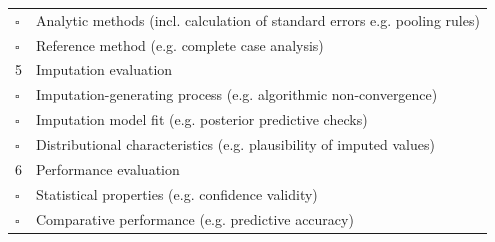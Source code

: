 \documentclass[bimj,fleqn]{w-art}
\begin{document}
\begin{table}[ht]
\begin{tabular}{ll}
$\square$  & Analytic methods (incl. calculation of standard errors e.g. pooling   rules)       \\
$\square$  & Reference method (e.g. complete case analysis)                                    \\ \hline 
5 & Imputation evaluation                                                              \\ \cline{2-2}
$\square$  & Imputation-generating process (e.g. algorithmic non-convergence)                   \\
$\square$  & Imputation model fit (e.g. posterior predictive checks)                            \\
$\square$  & Distributional characteristics (e.g. plausibility of imputed values)               \\ \hline 
6 & Performance evaluation                                                             \\ \cline{2-2}
$\square$  & Statistical properties (e.g. confidence validity)                                  \\
$\square$  & Comparative performance (e.g. predictive accuracy)                                 \\ \hline
\end{tabular}
\end{table}





\end{document}
